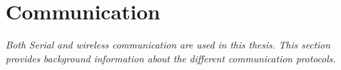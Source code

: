 \section{Communication}
\label{sec:tCommunication}
\textit{Both Serial and wireless communication are used in this thesis. This section provides background information about the different communication protocols.}


%